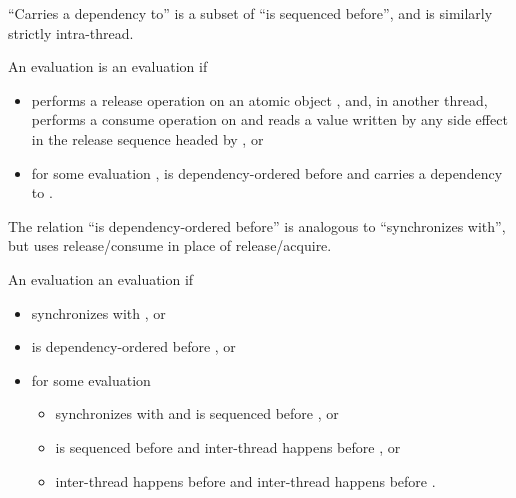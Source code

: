\begin{note} ``Carries a dependency to'' is a subset of ``is sequenced before'',
and is similarly strictly intra-thread. \end{note}

\pnum
An evaluation  is  an evaluation
 if
\begin{itemize}

\item
{} performs a release operation on an atomic object , and, in
another thread,  performs a consume operation on  and reads a
value written by any
%
side effect in the release sequence headed by , or

\item
for some evaluation ,  is dependency-ordered before  and
 carries a dependency to .

\end{itemize}
\begin{note} The relation ``is dependency-ordered before'' is analogous to
``synchronizes with'', but uses release/consume in place of release/acquire.
\end{note}

\pnum
An evaluation   an evaluation 
if

\begin{itemize}

\item
{} synchronizes with , or

\item
{} is dependency-ordered before , or

\item
for some evaluation 

\begin{itemize}
\item
{} synchronizes with  and  is sequenced before ,
or

\item
{} is sequenced before  and  inter-thread happens before
, or

\item
{} inter-thread happens before  and  inter-thread happens
before .
\end{itemize}
\end{itemize}

